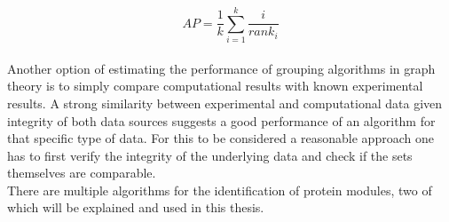 \begin{equation}
    AP = \frac{1}{k}\sum_{i=1}^{k} \frac{i}{rank_i}
\end{equation}\\
Another option of estimating the performance of grouping algorithms in graph theory is to simply compare computational results with known experimental results. A strong similarity between experimental and computational data given integrity of both data sources suggests a good performance of an algorithm for that specific type of data. For this to be considered a reasonable approach one has to first verify the integrity of the underlying data and check if the sets themselves are comparable. \\
There are multiple algorithms for the identification of protein modules, two of which will be explained and used in this thesis.

